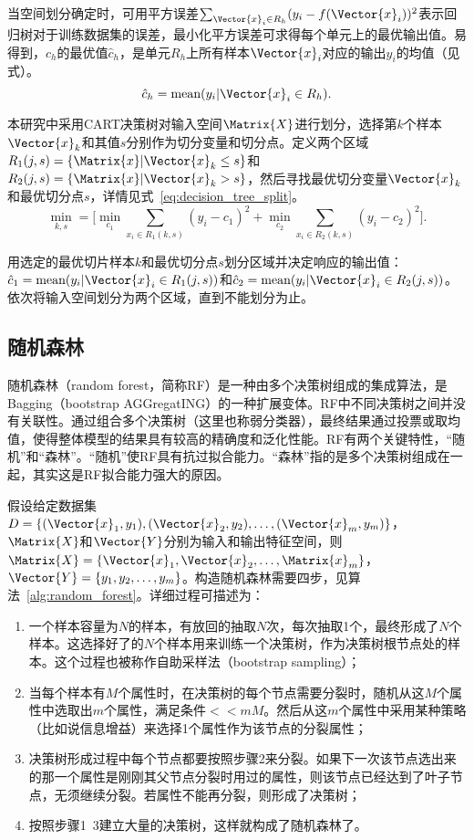 当空间划分确定时，可用平方误差$\sum_{\Vector{x}_i\in R_h}(y_i-f(\Vector{x}_i))^2$表示回归树对于训练数据集的误差，最小化平方误差可求得每个单元上的最优输出值。易得到，$c_h$的最优值$\hat{c}_h$，是单元$R_h$上所有样本$\Vector{x}_i$对应的输出$y_i$的均值（见式）。
\begin{equation}
  \label{eq:decision_tree_unit}
  \hat{c}_h=\text{mean}(y_i|\Vector{x}_i\in R_h).
\end{equation}

本研究中采用CART决策树对输入空间$\Matrix{X}$进行划分，选择第$k$个样本$\Vector{x}_k$和其值$s$分别作为切分变量和切分点。定义两个区域$R_1(j,s)=\{\Matrix{x}|\Vector{x}_k\le s\}$和$R_2(j,s)=\{\Matrix{x}|\Vector{x}_k>s\}$，然后寻找最优切分变量$\Vector{x}_k$和最优切分点$s$，详情见式~\ref{eq:decision_tree_split}。
\begin{equation}
  \label{eq:decision_tree_split}
  \min_{k,s}=\Bigg[\min_{c_1}^{}\sum_{x_i\in R_1(k,s)}(y_i-c_1)^2+\min_{c_2}^{}\sum_{x_i\in R_2(k,s)}(y_i-c_2)^2\Bigg].
\end{equation}

用选定的最优切片样本$k$和最优切分点$s$划分区域并决定响应的输出值：$\hat{c}_1=\text{mean}(y_i|\Vector{x}_i\in R_1(j,s))$和$\hat{c}_2=\text{mean}(y_i|\Vector{x}_i\in R_2(j,s))$。依次将输入空间划分为两个区域，直到不能划分为止。


\subsection{随机森林}\label{sec:随机森林}
随机森林（random forest，简称RF）是一种由多个决策树组成的集成算法，是Bagging（bootstrap AGGregatING）的一种扩展变体。RF中不同决策树之间并没有关联性。通过组合多个决策树（这里也称弱分类器），最终结果通过投票或取均值，使得整体模型的结果具有较高的精确度和泛化性能。RF有两个关键特性，``随机''和``森林''。``随机''使RF具有抗过拟合能力。``森林''指的是多个决策树组成在一起，其实这是RF拟合能力强大的原因。

假设给定数据集$D=\{(\Vector{x}_1,y_1),(\Vector{x}_2,y_2),\ldots,(\Vector{x}_m,y_m)\}$，$\Matrix{X}$和$\Vector{Y}$分别为输入和输出特征空间，则$\Matrix{X}=\{\Vector{x}_1,\Vector{x}_2,\ldots,\Matrix{x}_m\}$，$\Vector{Y}=\{y_1,y_2,\ldots,y_m\}$。构造随机森林需要四步，见算法~\ref{alg:random_forest}。详细过程可描述为：

\begin{enumerate}
\item 一个样本容量为$N$的样本，有放回的抽取$N$次，每次抽取1个，最终形成了$N$个样本。这选择好了的$N$个样本用来训练一个决策树，作为决策树根节点处的样本。这个过程也被称作自助采样法（bootstrap sampling）；
\item 当每个样本有$M$个属性时，在决策树的每个节点需要分裂时，随机从这$M$个属性中选取出$m$个属性，满足条件$<<mM$。然后从这$m$个属性中采用某种策略（比如说信息增益）来选择1个属性作为该节点的分裂属性；
\item 决策树形成过程中每个节点都要按照步骤2来分裂。如果下一次该节点选出来的那一个属性是刚刚其父节点分裂时用过的属性，则该节点已经达到了叶子节点，无须继续分裂。若属性不能再分裂，则形成了决策树；
\item 按照步骤1~3建立大量的决策树，这样就构成了随机森林了。
\end{enumerate}

